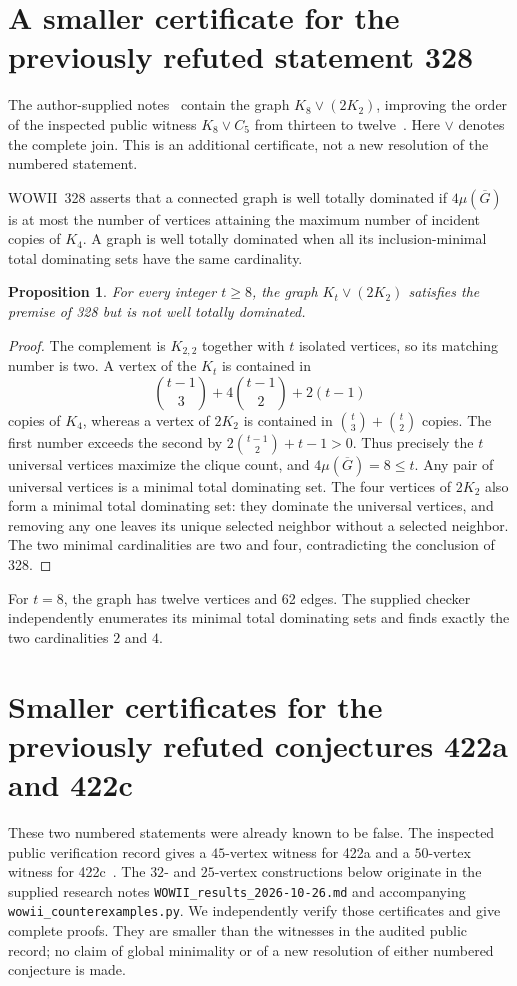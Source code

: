 \documentclass[11pt,a4paper]{article}
\newtheorem{proposition}[theorem]{Proposition}
\theoremstyle{remark}
\begin{document}
\section{A smaller certificate for the previously refuted statement 328}
\label{r7:sec328}
The author-supplied notes~\cite{UserNotes} contain the graph
$K_8\vee(2K_2)$, improving the order of the inspected public witness
$K_8\vee C_5$ from thirteen to twelve~\cite{Audit}.
Here $\vee$ denotes the complete join. This is an additional certificate,
not a new resolution of the numbered statement.

WOWII~328 asserts that a connected graph is well totally dominated if
$4\mu(\overline G)$ is at most the number of vertices attaining the
maximum number of incident copies of $K_4$. A graph is well totally
dominated when all its inclusion-minimal total dominating sets have the
same cardinality.

\begin{proposition}
For every integer $t\ge8$, the graph $K_t\vee(2K_2)$ satisfies the
premise of 328 but is not well totally dominated.
\end{proposition}
\begin{proof}
The complement is $K_{2,2}$ together with $t$ isolated vertices, so its
matching number is two. A vertex of the $K_t$ is contained in
\[
 \binom{t-1}{3}+4\binom{t-1}{2}+2(t-1)
\]
copies of $K_4$, whereas a vertex of $2K_2$ is contained in
$\binom t3+\binom t2$ copies. The first number exceeds the second by
$2\binom{t-1}{2}+t-1>0$. Thus precisely the $t$ universal vertices
maximize the clique count, and $4\mu(\overline G)=8\le t$.
Any pair of universal vertices is a minimal total dominating set.
The four vertices of $2K_2$ also form a minimal total dominating set:
they dominate the universal vertices, and removing any one leaves its
unique selected neighbor without a selected neighbor. The two minimal
cardinalities are two and four, contradicting the conclusion of 328.
\end{proof}
For $t=8$, the graph has twelve vertices and 62 edges. The supplied
checker independently enumerates its minimal total dominating sets and
finds exactly the two cardinalities $2$ and $4$.

\section{Smaller certificates for the previously refuted conjectures 422a and 422c}
\label{r7id:section}

These two numbered statements were already known to be false.
The inspected public verification record gives a $45$-vertex witness for
422a and a $50$-vertex witness for 422c~\cite[Sections~7bd--7be]{Audit}.
The $32$- and $25$-vertex constructions below originate in the supplied
research notes \texttt{WOWII\_results\_2026-10-26.md} and accompanying
\texttt{wowii\_counterexamples.py}.  We independently verify those
certificates and give complete proofs.  They are smaller than the
witnesses in the audited public record; no claim of global minimality or
of a new resolution of either numbered conjecture is made.
\end{document}
